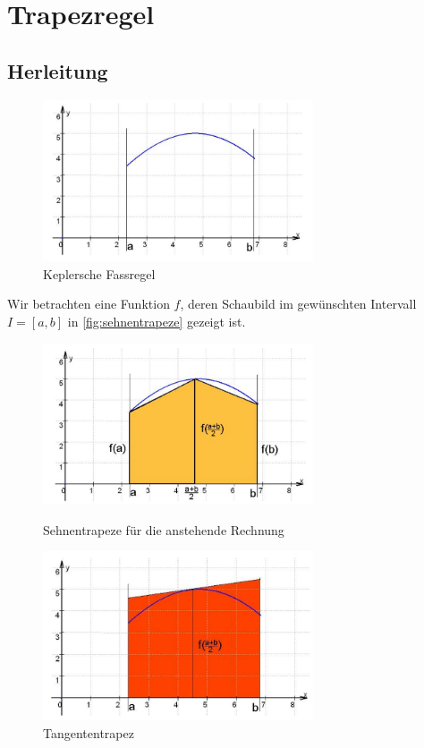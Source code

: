 \section{Trapezregel}
\label{sec:trapezregel}

\subsection{Herleitung}
\label{sec:herleitung}

\begin{figure}[h]
    \centering
    \includegraphics[width=8cm]{Bilder/keplersche_fassregel_funktion.png}
    \caption{Keplersche Fassregel \cite{skript}}    
    \label{fig:keplersche_fassregel}
\end{figure}

Wir betrachten eine Funktion $f$, deren Schaubild im gewünschten Intervall $I = [a, b]$ in \autoref{fig:sehnentrapeze} gezeigt ist.

\begin{figure}[!tbp]
    \centering
    \begin{minipage}[b]{0.4\textwidth}
        \includegraphics[width=8cm]{Bilder/sehnentrapeze.png}
      \caption{Sehnentrapeze für die anstehende Rechnung}
    \end{minipage}
    \hfill
    \begin{minipage}[b]{0.4\textwidth}
        \includegraphics[width=8cm]{Bilder/sehnentrapez_addiert.png}
      \caption{Tangententrapez  \cite{skript}}
    \end{minipage}
    \label{fig:sehnentrapeze}
  \end{figure}
